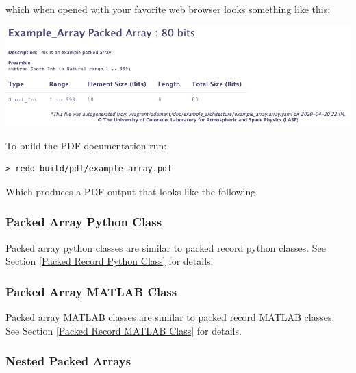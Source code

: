 which when opened with your favorite web browser looks something like this:

\vspace{5mm} %
\includegraphics[width=\textwidth]{images/arrayhtml.png}
\vspace{5mm} %

To build the PDF documentation run:

\vspace{5mm} %
\begin{verbatim}
> redo build/pdf/example_array.pdf
\end{verbatim}
\vspace{5mm} %

Which produces a PDF output that looks like the following. \\

\noindent\makebox[\linewidth]{\rule{\textwidth}{0.4pt}}

\noindent\makebox[\linewidth]{\rule{\textwidth}{0.4pt}}

\subsubsection{Packed Array Python Class}

Packed array python classes are similar to packed record python classes. See Section \ref{Packed Record Python Class} for details.

\subsubsection{Packed Array MATLAB Class}

Packed array MATLAB classes are similar to packed record MATLAB classes. See Section \ref{Packed Record MATLAB Class} for details.

\subsubsection{Nested Packed Arrays}

